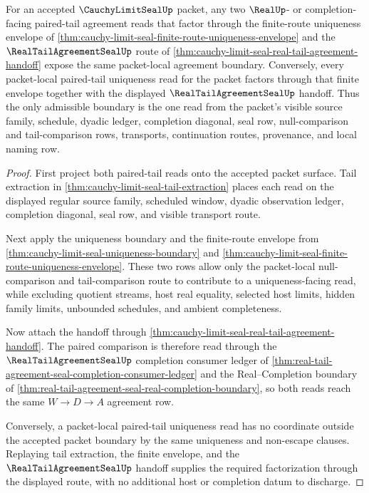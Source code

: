 \begin{theorem}
\label{thm:cauchy-limit-seal-paired-tail-agreement-uniqueness}
For an accepted $\CauchyLimitSealUp$ packet, any two $\RealUp$- or completion-facing paired-tail agreement reads that factor through the finite-route uniqueness envelope of \autoref{thm:cauchy-limit-seal-finite-route-uniqueness-envelope} and the $\RealTailAgreementSealUp$ route of \autoref{thm:cauchy-limit-seal-real-tail-agreement-handoff} expose the same packet-local agreement boundary. Conversely, every packet-local paired-tail uniqueness read for the packet factors through that finite envelope together with the displayed $\RealTailAgreementSealUp$ handoff. Thus the only admissible boundary is the one read from the packet's visible source family, schedule, dyadic ledger, completion diagonal, seal row, null-comparison and tail-comparison rows, transports, continuation routes, provenance, and local naming row.
\end{theorem}
\begin{proof}
First project both paired-tail reads onto the accepted packet surface. Tail extraction in \autoref{thm:cauchy-limit-seal-tail-extraction} places each read on the displayed regular source family, scheduled window, dyadic observation ledger, completion diagonal, seal row, and visible transport route.

Next apply the uniqueness boundary and the finite-route envelope from \autoref{thm:cauchy-limit-seal-uniqueness-boundary} and \autoref{thm:cauchy-limit-seal-finite-route-uniqueness-envelope}. These two rows allow only the packet-local null-comparison and tail-comparison route to contribute to a uniqueness-facing read, while excluding quotient streams, host real equality, selected host limits, hidden family limits, unbounded schedules, and ambient completeness.

Now attach the handoff through \autoref{thm:cauchy-limit-seal-real-tail-agreement-handoff}. The paired comparison is therefore read through the $\RealTailAgreementSealUp$ completion consumer ledger of \autoref{thm:real-tail-agreement-seal-completion-consumer-ledger} and the Real--Completion boundary of \autoref{thm:real-tail-agreement-seal-real-completion-boundary}, so both reads reach the same $W \to D \to A$ agreement row.

Conversely, a packet-local paired-tail uniqueness read has no coordinate outside the accepted packet boundary by the same uniqueness and non-escape clauses. Replaying tail extraction, the finite envelope, and the $\RealTailAgreementSealUp$ handoff supplies the required factorization through the displayed route, with no additional host or completion datum to discharge.
\end{proof}

